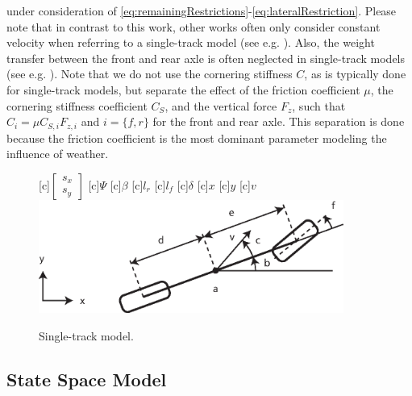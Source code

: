 \documentclass[11pt,a4paper]{article}
\renewcommand{\^}[1]{^{(#1)}}
\begin{document}
under consideration of \eqref{eq:remainingRestrictions}-\eqref{eq:lateralRestriction}. Please note that in contrast to this work, other works often only consider constant velocity when referring to a single-track model (see e.g. \cite[Sec.~2.3]{Rajamani2012}). Also, the weight transfer between the front and rear axle is often neglected in single-track models (see e.g. \cite{Jeon2011}). Note that we do not use the cornering stiffness $C$, as is typically done for single-track models, but separate the effect of the friction coefficient $\mu$, the cornering stiffness coefficient $C_{S}$, and the vertical force $F_z$, such that $C_i = \mu C_{S,i} F_{z,i}$ and $i=\{f,r\}$ for the front and rear axle. This separation is done because the friction coefficient is the most dominant parameter modeling the influence of weather. 

\begin{figure}[h]
    \centering		
    \footnotesize		
      [c]{$\begin{bmatrix} s_x \\ s_y \end{bmatrix}$}									 
      [c]{$\Psi$}	    
      [c]{$\beta$}	  
      [c]{$l_r$}
      [c]{$l_f$}
      [c]{$\delta$}
      [c]{$x$}
      [c]{$y$}
      [c]{$v$}						 
			\includegraphics[width=10cm]{./figures/bicycleModel.eps}
      \caption{Single-track model.}
      \label{fig:bicycleModel}
\end{figure}



\subsection{State Space Model}
\end{document}
